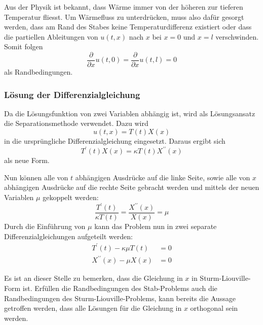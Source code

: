 Aus der Physik ist bekannt, dass Wärme immer von der höheren zur tieferen
Temperatur fliesst. Um Wärmefluss zu unterdrücken, muss also dafür gesorgt
werden, dass am Rand des Stabes keine Temperaturdifferenz existiert oder 
dass die partiellen Ableitungen von $u(t,x)$ nach $x$ bei $x = 0$ und $x = l$
verschwinden. Somit folgen
\begin{equation}
    \frac{\partial}{\partial x} u(t, 0)
    =
    \frac{\partial}{\partial x} u(t, l)
    =
    0
\end{equation}
als Randbedingungen.


\subsubsection{Lösung der Differenzialgleichung}


Da die Lösungsfunktion von zwei Variablen abhängig ist, wird als Lösungsansatz
die Separationsmethode verwendet. Dazu wird 
\begin{equation}
    u(t,x)
    =
    T(t)X(x)
\end{equation}
in die ursprüngliche Differenzialgleichung eingesetzt. Daraus ergibt sich 
\begin{equation}
    T^{\prime}(t)X(x)
    =
    \kappa T(t)X^{\prime \prime}(x)
\end{equation}
als neue Form.

Nun können alle von $t$ abhängigen Ausdrücke auf die linke Seite, sowie alle
von $x$ abhängigen Ausdrücke auf die rechte Seite gebracht werden und mittels
der neuen Variablen $\mu$ gekoppelt werden:
\begin{equation}
    \frac{T^{\prime}(t)}{\kappa T(t)}
    =
    \frac{X^{\prime \prime}(x)}{X(x)}
    =
    \mu
\end{equation}
Durch die Einführung von $\mu$ kann das Problem nun in zwei separate
Differenzialgleichungen aufgeteilt werden:
\begin{equation}
\begin{aligned}
    T^{\prime}(t) - \kappa \mu T(t)
    &=
    0
    \\
    X^{\prime \prime}(x) - \mu X(x)
    &=
    0
\end{aligned}
\end{equation}

Es ist an dieser Stelle zu bemerken, dass die Gleichung in $x$ in 
Sturm-Liouville-Form ist. Erfüllen die Randbedingungen des Stab-Problems auch
die Randbedingungen des Sturm-Liouville-Problems, kann bereits die Aussage
getroffen werden, dass alle Lösungen für die Gleichung in $x$ orthogonal sein
werden.

